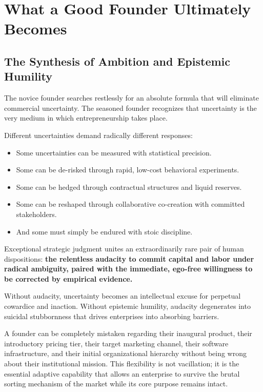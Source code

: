 \section{What a Good Founder Ultimately Becomes}

\subsection{The Synthesis of Ambition and Epistemic Humility}

The novice founder searches restlessly for an absolute formula that will eliminate commercial uncertainty. The seasoned founder recognizes that uncertainty is the very medium in which entrepreneurship takes place.

Different uncertainties demand radically different responses:
\begin{itemize}[leftmargin=10pt,itemsep=1pt,topsep=1pt]
  \item Some uncertainties can be measured with statistical precision.
  \item Some can be de-risked through rapid, low-cost behavioral experiments.
  \item Some can be hedged through contractual structures and liquid reserves.
  \item Some can be reshaped through collaborative co-creation with committed stakeholders.
  \item And some must simply be endured with stoic discipline.
\end{itemize}

Exceptional strategic judgment unites an extraordinarily rare pair of human dispositions: \textbf{the relentless audacity to commit capital and labor under radical ambiguity, paired with the immediate, ego-free willingness to be corrected by empirical evidence.}

Without audacity, uncertainty becomes an intellectual excuse for perpetual cowardice and inaction. Without epistemic humility, audacity degenerates into suicidal stubbornness that drives enterprises into absorbing barriers.

A founder can be completely mistaken regarding their inaugural product, their introductory pricing tier, their target marketing channel, their software infrastructure, and their initial organizational hierarchy without being wrong about their institutional mission. This flexibility is not vacillation; it is the essential adaptive capability that allows an enterprise to survive the brutal sorting mechanism of the market while its core purpose remains intact.

